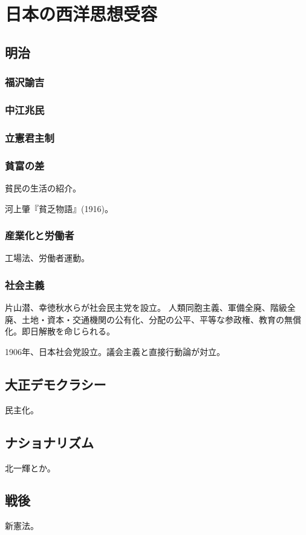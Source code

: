 
\chapter{日本の西洋思想受容}


\section{明治}


\subsection{福沢諭吉}


\subsection{中江兆民}


\subsection{立憲君主制}



\subsection{貧富の差}

貧民の生活の紹介。

河上肇『貧乏物語』(1916)。

\subsection{産業化と労働者}

工場法、労働者運動。

\subsection{社会主義}

片山潜、幸徳秋水らが社会民主党を設立。
人類同胞主義、軍備全廃、階級全廃、土地・資本・交通機関の公有化、分配の公平、平等な参政権、教育の無償化。即日解散を命じられる。

1906年、日本社会党設立。議会主義と直接行動論が対立。






\section{大正デモクラシー}

民主化。




\section{ナショナリズム}

北一輝とか。


\section{戦後}

新憲法。










